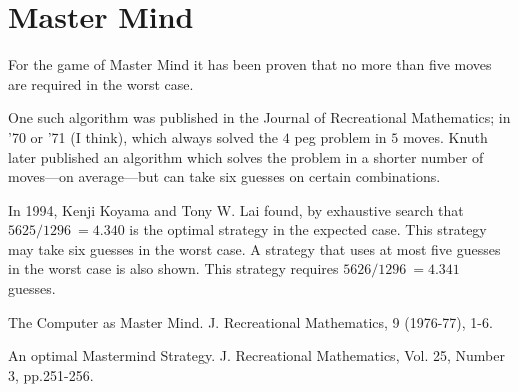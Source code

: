 \section{Master Mind}

For the game of Master Mind it has been proven that no more than five
moves are required in the worst case.

One such algorithm was published in the Journal of Recreational
Mathematics; in '70 or '71 (I think), which always solved the $4$ peg
problem in $5$ moves. Knuth later published an algorithm which solves
the problem in a shorter number of moves---on average---but can take six
guesses on certain combinations.

In 1994, Kenji Koyama and Tony W. Lai found, by exhaustive search that
$5625/1296~=4.340$ is the optimal strategy in the expected case. This
strategy may take six guesses in the worst case.  A strategy that uses
at most five guesses in the worst case is also shown. This strategy
requires $5626/1296~=4.341$ guesses.


\Ref

  {The Computer as Master Mind.}
{J. Recreational Mathematics,} { 9 (1976-77), 1-6.}

  {An optimal Mastermind Strategy.}
{J. Recreational Mathematics,} {Vol. 25, Number 3, pp.251-256.}
